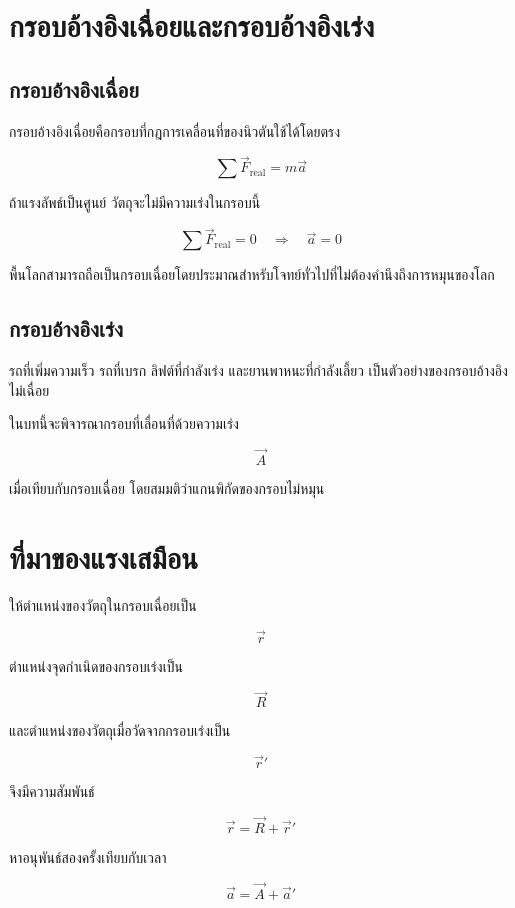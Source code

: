 \section{กรอบอ้างอิงเฉื่อยและกรอบอ้างอิงเร่ง}

\subsection{กรอบอ้างอิงเฉื่อย}

กรอบอ้างอิงเฉื่อยคือกรอบที่กฎการเคลื่อนที่ของนิวตันใช้ได้โดยตรง

\[
\boxed{\sum \vec F_{\text{real}}=m\vec a}
\]

ถ้าแรงลัพธ์เป็นศูนย์ วัตถุจะไม่มีความเร่งในกรอบนี้

\[
\sum \vec F_{\text{real}}=0
\quad \Rightarrow \quad
\vec a=0
\]

พื้นโลกสามารถถือเป็นกรอบเฉื่อยโดยประมาณสำหรับโจทย์ทั่วไปที่ไม่ต้องคำนึงถึงการหมุนของโลก

\subsection{กรอบอ้างอิงเร่ง}

รถที่เพิ่มความเร็ว รถที่เบรก ลิฟต์ที่กำลังเร่ง และยานพาหนะที่กำลังเลี้ยว เป็นตัวอย่างของกรอบอ้างอิงไม่เฉื่อย

ในบทนี้จะพิจารณากรอบที่เลื่อนที่ด้วยความเร่ง

\[
\vec A
\]

เมื่อเทียบกับกรอบเฉื่อย โดยสมมติว่าแกนพิกัดของกรอบไม่หมุน

\section{ที่มาของแรงเสมือน}

ให้ตำแหน่งของวัตถุในกรอบเฉื่อยเป็น

\[
\vec r
\]

ตำแหน่งจุดกำเนิดของกรอบเร่งเป็น

\[
\vec R
\]

และตำแหน่งของวัตถุเมื่อวัดจากกรอบเร่งเป็น

\[
\vec r'
\]

จึงมีความสัมพันธ์

\[
\vec r=\vec R+\vec r'
\]

หาอนุพันธ์สองครั้งเทียบกับเวลา

\[
\vec a=\vec A+\vec a'
\]

